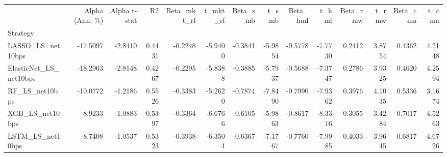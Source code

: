 \begin{tabular}{lrrrrrrrrrrrrr}
\toprule
 & Alpha (Ann. \%) & Alpha t-stat & R2 & Beta\_mkt\_rf & t\_mkt\_rf & Beta\_smb & t\_smb & Beta\_hml & t\_hml & Beta\_rmw & t\_rmw & Beta\_cma & t\_cma \\
Strategy &  &  &  &  &  &  &  &  &  &  &  &  &  \\
\midrule
LASSO\_LS\_net10bps & -17.5097 & -2.8410 & 0.4431 & -0.2248 & -5.9400 & -0.3841 & -5.9854 & -0.5778 & -7.7730 & 0.2412 & 3.8754 & 0.4362 & 4.2148 \\
ElasticNet\_LS\_net10bps & -18.2963 & -2.8148 & 0.4267 & -0.2295 & -5.8388 & -0.3885 & -5.7937 & -0.5688 & -7.3747 & 0.2786 & 3.9325 & 0.4620 & 4.2594 \\
RF\_LS\_net10bps & -10.0772 & -1.2186 & 0.5526 & -0.3383 & -5.2620 & -0.7874 & -7.8490 & -0.7990 & -7.9362 & 0.3976 & 4.1035 & 0.5336 & 3.1674 \\
XGB\_LS\_net10bps & -8.9233 & -1.0883 & 0.5397 & -0.3364 & -6.6766 & -0.6105 & -5.9863 & -0.8617 & -8.3316 & 0.3055 & 3.4284 & 0.7017 & 4.5263 \\
LSTM\_LS\_net10bps & -8.7408 & -1.0537 & 0.5323 & -0.3938 & -6.3504 & -0.6367 & -7.1767 & -0.7760 & -7.9985 & 0.4033 & 3.9645 & 0.6817 & 4.6726 \\
\bottomrule
\end{tabular}
